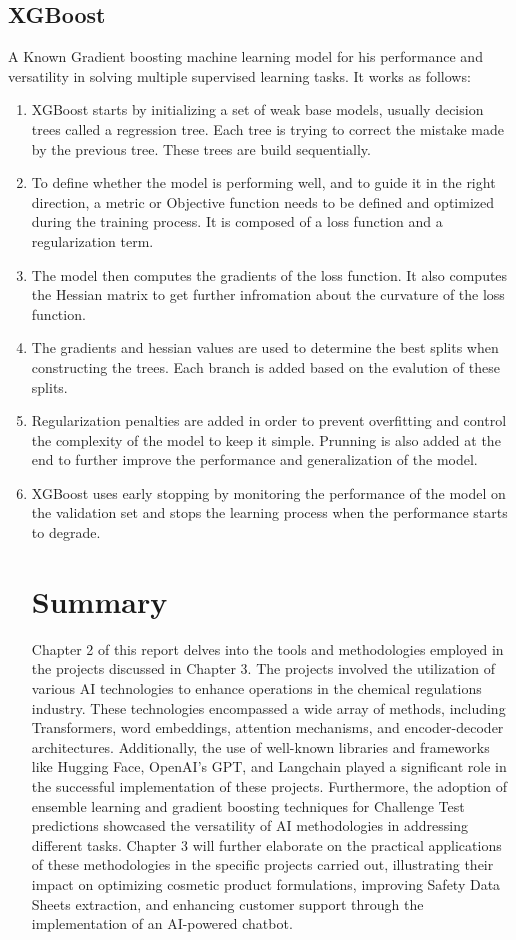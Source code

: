 \documentclass[a4paper,12pt,twoside]{report}
\begin{document}
\subsection{XGBoost}
A Known Gradient boosting machine learning model for his performance and versatility in solving multiple supervised learning tasks. It works as follows:
\begin{enumerate}	
\item XGBoost starts by initializing a set of weak base models, usually decision trees called a regression tree. Each tree is trying to correct the mistake made by the previous tree. These trees are build sequentially.
\item To define whether the model is performing well, and to guide it in the right direction, a metric or Objective function needs to be defined and optimized during the training process. It is composed of a loss function and a regularization term.
\item The model then computes the gradients of the loss function. It also computes the Hessian matrix to get further infromation about the curvature of the loss function.
\item The gradients and hessian values are used to determine the best splits when constructing the trees. Each branch is added based on the evalution of these splits.
\item Regularization penalties are added in order to prevent overfitting and control the complexity of the model to keep it simple. Prunning is also added at the end to further improve the performance and generalization of the model.
\item XGBoost uses early stopping by monitoring the performance of the model on the validation set and stops the learning process when the performance starts to degrade.

\section{Summary}
Chapter 2 of this report delves into the tools and methodologies employed in the projects discussed in Chapter 3. The projects involved the utilization of various AI technologies to enhance operations in the chemical regulations industry. These technologies encompassed a wide array of methods, including Transformers, word embeddings, attention mechanisms, and encoder-decoder architectures. Additionally, the use of well-known libraries and frameworks like Hugging Face, OpenAI's GPT, and Langchain played a significant role in the successful implementation of these projects. Furthermore, the adoption of ensemble learning and gradient boosting techniques for Challenge Test predictions showcased the versatility of AI methodologies in addressing different tasks. Chapter 3 will further elaborate on the practical applications of these methodologies in the specific projects carried out, illustrating their impact on optimizing cosmetic product formulations, improving Safety Data Sheets extraction, and enhancing customer support through the implementation of an AI-powered chatbot.
\end{enumerate}
\end{document}
